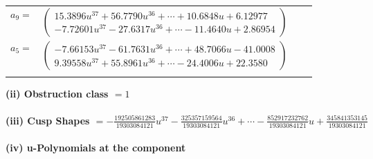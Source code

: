 \documentclass[1p]{elsarticle_modified}
\theoremstyle{definition}
\begin{document}
\begin{tabular}{m{7pt} m{180pt} m{7pt} m{180pt} }
\flushright $a_{9}=$&$\begin{pmatrix}15.3896 u^{37}+56.7790 u^{36}+\cdots+10.6848 u+6.12977\\-7.72601 u^{37}-27.6317 u^{36}+\cdots-11.4640 u+2.86954\end{pmatrix}$ \\
\flushright $a_{5}=$&$\begin{pmatrix}-7.66153 u^{37}-61.7631 u^{36}+\cdots+48.7066 u-41.0008\\9.39558 u^{37}+55.8961 u^{36}+\cdots-24.4006 u+22.3580\end{pmatrix}$\\&\end{tabular}
\flushleft \textbf{(ii) Obstruction class $= 1$}\\~\\
\flushleft \textbf{(iii) Cusp Shapes $= -\frac{192505861283}{19303084121} u^{37}-\frac{325357159564}{19303084121} u^{36}+\cdots-\frac{852917232762}{19303084121} u+\frac{345841353145}{19303084121}$}\\~\\
\newpage\renewcommand{\arraystretch}{1}
\flushleft \textbf{(iv) u-Polynomials at the component}\newline \\
\end{document}
